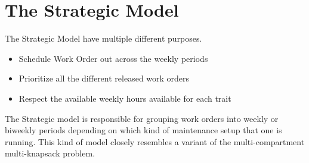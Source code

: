 \section{The Strategic Model}


The Strategic Model have multiple different purposes.
\begin{itemize}
	\item Schedule Work Order out across the weekly periods
	\item Prioritize all the different released work orders
	\item Respect the available weekly hours available for each trait
\end{itemize}

The Strategic model is responsible for grouping work orders into weekly or biweekly periods depending on which kind of maintenance setup that one is running.
This kind of model closely resembles a variant of the multi-compartment multi-knapsack problem. 

